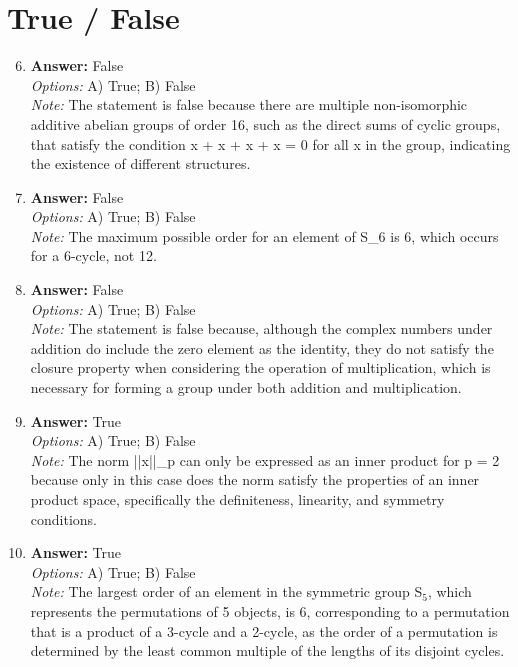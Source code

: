 \documentclass[12pt]{article}
\begin{document}
\section*{True / False}
\begin{enumerate}[label=\arabic*.]
\setcounter{enumi}{5}
\item \textbf{Answer:} False
\\ \textit{Options:} A) True; B) False
\\ \textit{Note:} The statement is false because there are multiple non-isomorphic additive abelian groups of order 16, such as the direct sums of cyclic groups, that satisfy the condition x + x + x + x = 0 for all x in the group, indicating the existence of different structures.
\item \textbf{Answer:} False
\\ \textit{Options:} A) True; B) False
\\ \textit{Note:} The maximum possible order for an element of S\_6 is 6, which occurs for a 6-cycle, not 12.
\item \textbf{Answer:} False
\\ \textit{Options:} A) True; B) False
\\ \textit{Note:} The statement is false because, although the complex numbers under addition do include the zero element as the identity, they do not satisfy the closure property when considering the operation of multiplication, which is necessary for forming a group under both addition and multiplication.
\item \textbf{Answer:} True
\\ \textit{Options:} A) True; B) False
\\ \textit{Note:} The norm ||x||\_p can only be expressed as an inner product for p = 2 because only in this case does the norm satisfy the properties of an inner product space, specifically the definiteness, linearity, and symmetry conditions.
\item \textbf{Answer:} True
\\ \textit{Options:} A) True; B) False
\\ \textit{Note:} The largest order of an element in the symmetric group S$_{5}$, which represents the permutations of 5 objects, is 6, corresponding to a permutation that is a product of a 3-cycle and a 2-cycle, as the order of a permutation is determined by the least common multiple of the lengths of its disjoint cycles.
\end{enumerate}
\end{document}
